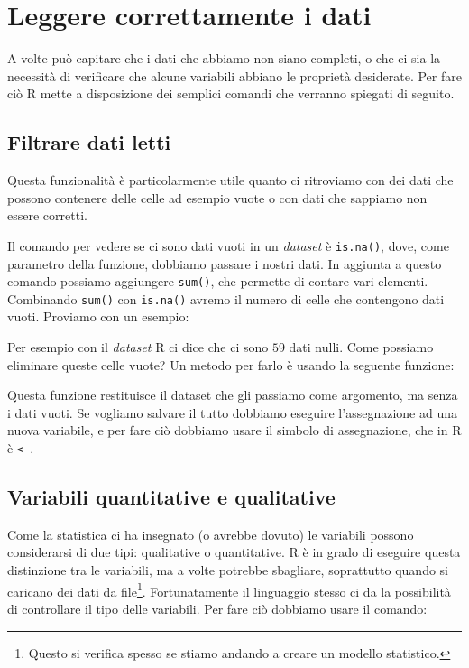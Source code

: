 \chapter{Leggere correttamente i dati}

A volte può capitare che i dati che abbiamo non siano completi, o che ci sia la
necessità di verificare che alcune variabili abbiano le proprietà desiderate.
Per fare ciò R mette a disposizione dei semplici comandi che verranno spiegati
di seguito.

\section{Filtrare dati letti}

Questa funzionalità è particolarmente utile quanto ci ritroviamo con dei dati
che possono contenere delle celle ad esempio vuote o con dati che sappiamo non
essere corretti.

Il comando per vedere se ci sono dati vuoti in un \textit{dataset} è
\texttt{is.na()}, dove, come parametro della funzione, dobbiamo passare i
nostri dati. In aggiunta a questo comando possiamo aggiungere \texttt{sum()},
che permette di contare vari elementi. Combinando \texttt{sum()} con
\texttt{is.na()} avremo il numero di celle che contengono dati vuoti.
Proviamo con un esempio:



Per esempio con il \textit{dataset} R ci dice che ci sono $59$ dati nulli.
Come possiamo eliminare queste celle vuote? Un metodo per farlo è usando la
seguente funzione:



Questa funzione restituisce il dataset che gli passiamo come argomento, ma
senza i dati vuoti. Se vogliamo salvare il tutto dobbiamo eseguire
l'assegnazione ad una nuova variabile, e per fare ciò dobbiamo usare il simbolo
di assegnazione, che in R è \texttt{<-}.

\section{Variabili quantitative e qualitative}

Come la statistica ci ha insegnato (o avrebbe dovuto) le variabili possono
considerarsi di due tipi: qualitative o quantitative. R è in grado di eseguire
questa distinzione tra le variabili, ma a volte potrebbe sbagliare, soprattutto
quando si caricano dei dati da file\footnote{Questo si verifica spesso se
stiamo andando a creare un modello statistico.}.
Fortunatamente il linguaggio stesso ci da la possibilità di controllare il tipo
delle variabili. Per fare ciò dobbiamo usare il comando:

